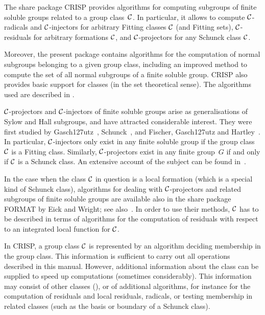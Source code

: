 
%

\def\CRISP{{\sf CRISP}}


The share package {\CRISP} provides algorithms for computing subgroups of
finite soluble groups related to a group class~$\cal C$. In particular, it
allows to compute $\cal C$-radicals and $\cal C$-injectors for
arbitrary Fitting classes $\cal C$ (and Fitting sets), $\cal C$-residuals
for arbitrary formations $\cal C$, and $\cal C$-projectors for any Schunck
class $\cal C$.

Moreover, the present package contains algorithms for the computation of
normal subgroups belonging to a given group class, including an improved
method to compute the set of all normal subgroups of a finite soluble
group. {\CRISP} also provides basic support for classes (in
the set theoretical sense). The algorithms used are described in
\cite{HoePP1999a}.

$\cal C$-projectors and $\cal C$-injectors of finite soluble groups
arise as generalisations of Sylow and Hall subgroups, and have attracted
considerable interest. They were first studied
by Gasch\accent127utz~\cite{Ga1963}, Schunck~\cite{Sch1967}, and Fischer,
Gasch\accent127utz and Hartley~\cite{FGH1967}. In particular, $\cal
C$-injectors only exist in any finite soluble group if the group class
$\cal C$ is a Fitting class. Similarly, $\cal C$-projectors exist in any
finite group~$G$ if and only if $\cal C$ is a Schunck class. An extensive
account of the subject can be found in~\cite{DH1992}.

In the case when the class $\cal C$ in question is a local formation (which is
a special kind of Schunck class), algorithms for dealing with $\cal
C$-projectors and related subgroups of finite soluble groups are available
also in the {\GAP} share package FORMAT by Eick and Wright; see
also~\cite{EW1999}. In order to use their methods, $\cal C$ has to be
described in terms of algorithms for the computation of residuals with
respect to an integrated local function for $\cal C$.

In {\CRISP}, a group class $\cal C$ is represented by an algorithm
deciding membership in the group class. This information is sufficient to
carry out all operations described in this manual. However, additional
information about the class can be supplied to speed up computations
(sometimes considerably). This information may consist of other classes
(), or of additional algorithms, for instance for the computation of
residuals and local residuals, radicals, or testing membership in related
classes (such as the basis or boundary of a Schunck class).


